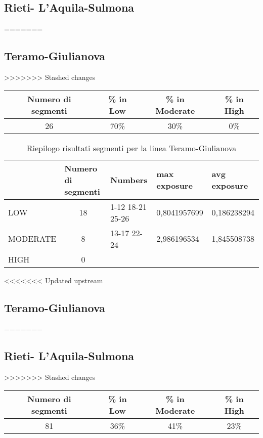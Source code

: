 \subsection{Rieti- L'Aquila-Sulmona}
\label{app:sulmonarieti}
=======

\subsection{Teramo-Giulianova}
>>>>>>> Stashed changes
\centering
\begin{tabular}  {|c|c|c|c|} 
	
	\hline 
	Numero di segmenti  & \% in Low & \% in Moderate & \% in High \\ 
	\hline 
	26  & 70\% & 30\% & 0\% \\ 
	\hline 
\end{tabular} 
\begin{table}[bh]
	\centering
	\caption{Riepilogo risultati segmenti per la linea Teramo-Giulianova}
	\label{my-label}
	\begin{tabular}{|l|c|l|l|l|}
		\hline
		& \multicolumn{1}{l|}{Numero di segmenti} & Numbers          & max exposure & avg exposure \\ \hline
		LOW      & 18                                      & 1-12 18-21 25-26 & 0,8041957699 & 0,186238294  \\ \hline
		MODERATE & 8                                       & 13-17 22-24      & 2,986196534  & 1,845508738  \\ \hline
		HIGH     & 0                                       &                  &              &              \\ \hline
	\end{tabular}
\end{table}
\newpage
<<<<<<< Updated upstream
\subsection{Teramo-Giulianova}
\label{app:giulianovateramo}
=======

\subsection{Rieti- L'Aquila-Sulmona}

>>>>>>> Stashed changes
\centering
\begin{tabular}  {|c|c|c|c|} 
	
	\hline 
	Numero di segmenti  & \% in Low & \% in Moderate & \% in High \\ 
	\hline 
	81  & 36\% & 41\% & 23\% \\ 
	\hline 
\end{tabular} 

